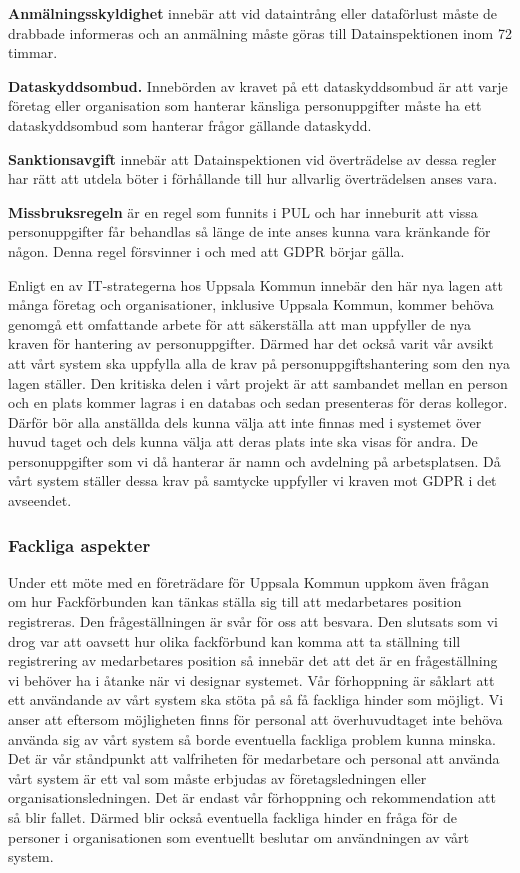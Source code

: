 \documentclass[swedish, a4paper,12pt]{article}
\begin{document}
\textbf{Anmälningsskyldighet} innebär att vid dataintrång eller dataförlust måste de drabbade informeras och an anmälning måste göras till Datainspektionen inom 72 timmar.

\textbf{Dataskyddsombud.} Innebörden av kravet på ett dataskyddsombud är att varje företag eller organisation som hanterar känsliga personuppgifter måste ha ett dataskyddsombud som hanterar frågor gällande dataskydd.

\textbf{Sanktionsavgift} innebär att Datainspektionen vid överträdelse av dessa regler har rätt att utdela böter i förhållande till hur allvarlig överträdelsen anses vara.

\textbf{Missbruksregeln} är en regel som funnits i PUL och har inneburit att vissa personuppgifter får behandlas så länge de inte anses kunna vara kränkande för någon. Denna regel försvinner i och med att GDPR börjar gälla.

Enligt en av IT-strategerna hos Uppsala Kommun innebär den här nya lagen att många företag och organisationer, inklusive Uppsala Kommun, kommer behöva genomgå ett omfattande arbete för att säkerställa att man uppfyller de nya kraven för hantering av personuppgifter. Därmed har det också varit vår avsikt att vårt system ska uppfylla alla de krav på personuppgiftshantering som den nya lagen ställer. Den kritiska delen i vårt projekt är att sambandet mellan en person och en plats kommer lagras i en databas och sedan presenteras för deras kollegor. Därför bör alla anställda dels kunna välja att inte finnas med i systemet över huvud taget och dels kunna välja att deras plats inte ska visas för andra. De personuppgifter som vi då hanterar är namn och avdelning på arbetsplatsen. Då vårt system ställer dessa krav på samtycke uppfyller vi kraven mot GDPR i det avseendet.
\newpage
\subsubsection{Fackliga aspekter}
Under ett möte med en företrädare för Uppsala Kommun uppkom även frågan om hur Fackförbunden kan tänkas ställa sig till att medarbetares position registreras.
Den frågeställningen är svår för oss att besvara. Den slutsats som vi drog var att oavsett hur olika fackförbund kan komma att ta ställning till registrering av medarbetares position så innebär det att det är en frågeställning vi behöver ha i åtanke när vi designar systemet. Vår förhoppning är såklart att ett användande av vårt system ska stöta på så få fackliga hinder som möjligt. Vi anser att eftersom möjligheten finns för personal att överhuvudtaget inte behöva använda sig av vårt system så borde eventuella fackliga problem kunna minska. Det är vår ståndpunkt att valfriheten för medarbetare och personal att använda vårt system är ett val som måste erbjudas av företagsledningen eller organisationsledningen. Det är endast vår förhoppning och rekommendation att så blir fallet. Därmed blir också eventuella fackliga hinder en fråga för de personer i organisationen som eventuellt beslutar om användningen av vårt system.
\end{document}
